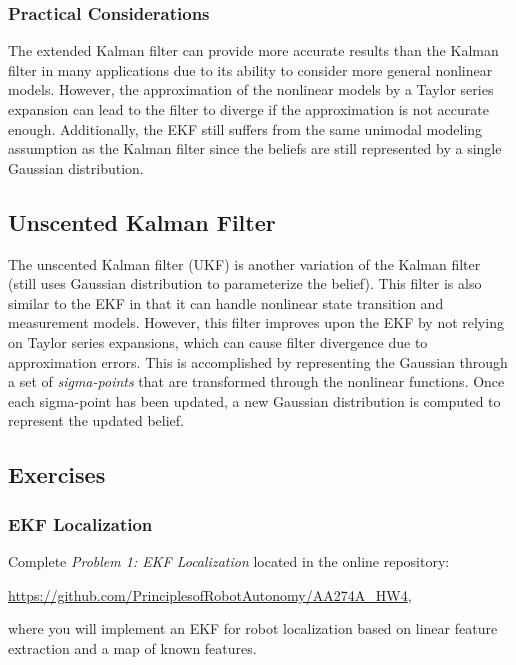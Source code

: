\subsubsection{Practical Considerations}
The extended Kalman filter can provide more accurate results than the Kalman filter in many applications due to its ability to consider more general nonlinear models. However, the approximation of the nonlinear models by a Taylor series expansion can lead to the filter to diverge if the approximation is not accurate enough.
Additionally, the EKF still suffers from the same unimodal modeling assumption as the Kalman filter since the beliefs are still represented by a single Gaussian distribution.

\subsection{Unscented Kalman Filter}
The unscented Kalman filter (UKF) is another variation of the Kalman filter (still uses Gaussian distribution to parameterize the belief). This filter is also similar to the EKF in that it can handle nonlinear state transition and measurement models. However, this filter improves upon the EKF by not relying on Taylor series expansions, which can cause filter divergence due to approximation errors. 
This is accomplished by representing the Gaussian through a set of \textit{sigma-points} that are transformed through the nonlinear functions. Once each sigma-point has been updated, a new Gaussian distribution is computed to represent the updated belief.

\subsection{Exercises}
\subsubsection{EKF Localization}
Complete \textit{Problem 1: EKF Localization} located in the online repository:

\vspace{\baselineskip}

\url{https://github.com/PrinciplesofRobotAutonomy/AA274A_HW4},

\vspace{\baselineskip}

where you will implement an EKF for robot localization based on linear feature extraction and a map of known features.